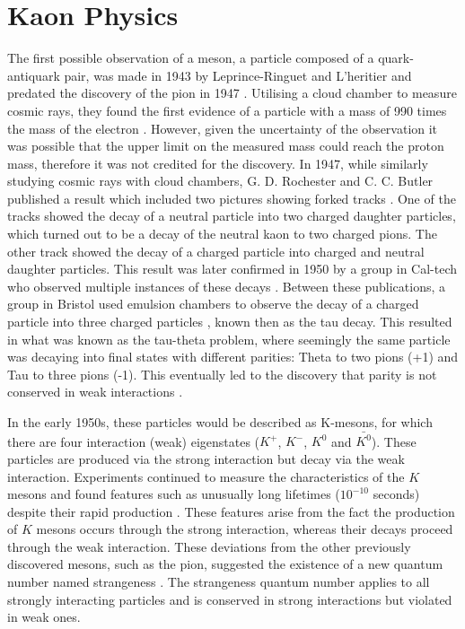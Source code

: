 \documentclass[../main.tex]{subfiles}
\begin{document}
    \section{Kaon Physics}
    The first possible observation of a meson, a particle composed of a quark-antiquark pair, was made in 1943 by Leprince-Ringuet and L'heritier \cite{Cahn_Goldhaber_2009, 10.1063/PT.3.1989} and predated the discovery of the pion in 1947 \cite{Lattes1947}. Utilising a cloud chamber to measure cosmic rays, they found the first evidence of a particle with a mass of 
    990 times the mass of the electron \cite{Navas:2024}. However, given the uncertainty of the observation it was possible that the upper limit on the measured mass could reach the proton mass, therefore it was not credited for the discovery. In 1947, while similarly studying cosmic rays with cloud chambers, G. D. Rochester and C. C. Butler published a result which included
    two pictures showing forked tracks \cite{Rochester1947}. One of the tracks showed the decay of a neutral particle into two charged daughter particles, which turned out to be a decay of the neutral kaon to two charged pions. The other track showed the decay of a charged particle into charged and neutral daughter particles.
    This result was later confirmed in 1950 by a group in Cal-tech who observed multiple instances of these decays \cite{Seriff:1950ajp}. Between these publications, a group in Bristol used emulsion chambers to observe the decay of a charged particle into three charged particles \cite{Brown1949}, known then as the tau decay. 
    This resulted in what was known as the tau-theta problem, where seemingly the same particle was decaying into final states with different parities: Theta to two pions (+1) and Tau to three pions (-1). This eventually led to the discovery that parity is not conserved in weak interactions \cite{PhysRev.104.254}. 

    In the early 1950s, these particles would be described as K-mesons, for which there are four interaction (weak) eigenstates ($K^+$, $K^-$, $K^0$ and $\bar{K^0}$). These particles are produced via the strong interaction but decay via the weak interaction. Experiments continued to measure the characteristics of the $K$ mesons and found features such as unusually long lifetimes ($10^{-10}$ seconds) despite their rapid production \cite{PhysRev.86.663}. These features arise from the fact the production of $K$ mesons occurs through the strong interaction, whereas their decays proceed through the weak interaction.
    These deviations from the other previously discovered mesons, such as the pion, suggested the existence of a new quantum number named strangeness \cite{PhysRev.92.833, Gell-Mann:1956iqa}. 
    The strangeness quantum number applies to all strongly interacting particles and is conserved in strong interactions but violated in weak ones.
\end{document}
